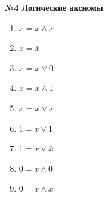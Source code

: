     \begin{center}
        \textbf{№4 Логические аксиомы}
    \end{center}

    \begin{minipage}[t]{0.3\textwidth}
        \centering
        \begin{enumerate}
            \item $x = x \wedge x$
            \item $x = \overline{\overline x}$
            \item $x = x \vee 0$
        \end{enumerate}
    \end{minipage}
    \begin{minipage}[t]{0.3\textwidth}
        \centering
        \begin{enumerate}
            \setcounter{enumi}{3}
            \item $x = x \wedge 1$
            \item $x = x \vee x$
            \item $1 = x \vee 1$
        \end{enumerate}
    \end{minipage}
    \begin{minipage}[t]{0.3\textwidth}
        \centering
        \begin{enumerate}
            \setcounter{enumi}{6}
            \item $1 = x \vee \bar x$
            \item $0 = x \wedge 0$
            \item $0 = x \wedge \bar x$
        \end{enumerate}
    \end{minipage}

